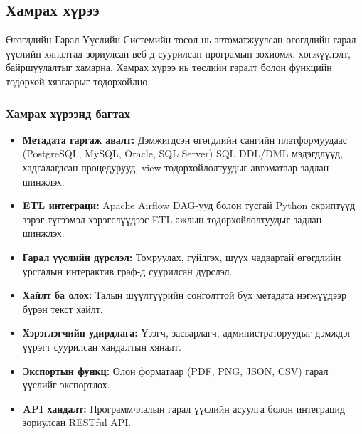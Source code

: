 \subsection{Хамрах хүрээ}
\label{subsec:dl_scope}

Өгөгдлийн Гарал Үүслийн Системийн төсөл нь автоматжуулсан өгөгдлийн гарал үүслийн хяналтад зориулсан веб-д суурилсан програмын зохиомж, хөгжүүлэлт, байршуулалтыг хамарна. Хамрах хүрээ нь төслийн гаралт болон функцийн тодорхой хязгаарыг тодорхойлно.

\subsubsection{Хамрах хүрээнд багтах}

\begin{itemize}
    \item \textbf{Метадата гаргаж авалт:} Дэмжигдсэн өгөгдлийн сангийн платформуудаас (PostgreSQL, MySQL, Oracle, SQL Server) SQL DDL/DML мэдэгдлүүд, хадгалагдсан процедурууд, view тодорхойлолтуудыг автоматаар задлан шинжлэх.
    
    \item \textbf{ETL интеграци:} Apache Airflow DAG-ууд болон тусгай Python скриптүүд зэрэг түгээмэл хэрэгслүүдээс ETL ажлын тодорхойлолтуудыг задлан шинжлэх.
    
    \item \textbf{Гарал үүслийн дүрслэл:} Томруулах, гүйлгэх, шүүх чадвартай өгөгдлийн урсгалын интерактив граф-д суурилсан дүрслэл.
    
    \item \textbf{Хайлт ба олох:} Талын шүүлтүүрийн сонголттой бүх метадата нэгжүүдээр бүрэн текст хайлт.
    
    \item \textbf{Хэрэглэгчийн удирдлага:} Үзэгч, засварлагч, администраторуудыг дэмждэг үүрэгт суурилсан хандалтын хяналт.
    
    \item \textbf{Экспортын функц:} Олон форматаар (PDF, PNG, JSON, CSV) гарал үүслийг экспортлох.
    
    \item \textbf{API хандалт:} Программчлалын гарал үүслийн асуулга болон интеграцид зориулсан RESTful API.
\end{itemize}

